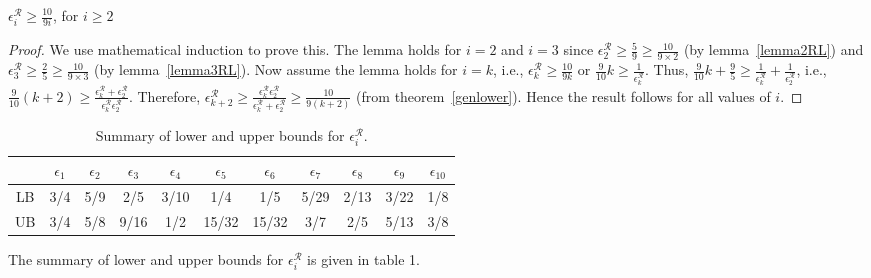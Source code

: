 \begin{lem}
 $\epsilon_i^{\mathcal{R}} \ge \frac{10}{9i}$, for $i \ge 2$
\end{lem}
\begin{proof}
We use mathematical induction to prove this.
The lemma holds for $i=2$ and $i=3$ since $\epsilon_2^{\mathcal{R}} \ge
\frac{5}{9} \ge \frac{10}{9 \times 2}$ (by lemma~\ref{lemma2RL}) and
$\epsilon_3^{\mathcal{R}} \ge \frac{2}{5} \ge \frac{10}{9 \times 3}$ (by lemma~\ref{lemma3RL}). Now assume the lemma holds for $i=k$,
i.e., $\epsilon_k^{\mathcal{R}} \ge \frac{10}{9k}$ or $\frac{9}{10}k \ge
\frac{1}{\epsilon_k^{\mathcal{R}}}$.
Thus, $\frac{9}{10}k + \frac{9}{5} \ge
\frac{1}{\epsilon_k^{\mathcal{R}}} + \frac{1}{\epsilon_2^{\mathcal{R}}}$, 
i.e., $\frac{9}{10} (k+2) \ge \frac{\epsilon_k^{\mathcal{R}} +
\epsilon_2^{\mathcal{R}}}{\epsilon_k^{\mathcal{R}} \epsilon_2^{\mathcal{R}}}$.
Therefore, $\epsilon_{k+2}^{\mathcal{R}} \ge \frac{\epsilon_k^{\mathcal{R}}
\epsilon_2^{\mathcal{R}}}{\epsilon_k^{\mathcal{R}} + \epsilon_2^{\mathcal{R}}} 
\ge \frac{10}{9(k+2)}$ (from theorem~\ref{genlower}).
Hence the result follows for all values of $i$.


\end{proof}

\begin{table}[t]\label{rectable}
\begin{centering}

\begin{tabular}{|c|c|c|c|c|c|c|c|c|c|c|}
\hline
&$\epsilon_{1}$&$\epsilon_{2}$&$\epsilon_{3}$&$\epsilon_{4}$&$\epsilon_{5}
$&$\epsilon_{6}$&$\epsilon_{7}$&$\epsilon_{8}$&$\epsilon_{9}$&$\epsilon_{10}$\\
\hline
LB&3/4&5/9&2/5&3/10&1/4&1/5&5/29&2/13&3/22&1/8\\
\hline
UB&3/4&5/8&9/16&1/2&15/32&15/32&3/7&2/5&5/13&3/8\\
\hline
\end{tabular}
\caption{Summary of lower and upper bounds for $\epsilon_{i}^{\mathcal{R}}$.
}
\end{centering}
\end{table} 

\noindent The summary of lower and upper bounds for $\epsilon_{i}^{\mathcal{R}}$ is given in table 1.
